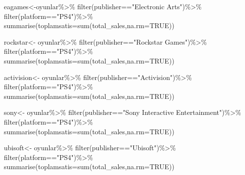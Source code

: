 \documentclass[
]{article}
\newenvironment{Shaded}{\begin{snugshade}}{\end{snugshade}}
\newcommand{\AttributeTok}[1]{\textcolor[rgb]{0.77,0.63,0.00}{#1}}
\newcommand{\ConstantTok}[1]{\textcolor[rgb]{0.00,0.00,0.00}{#1}}
\newcommand{\FunctionTok}[1]{\textcolor[rgb]{0.00,0.00,0.00}{#1}}
\newcommand{\NormalTok}[1]{#1}
\newcommand{\OtherTok}[1]{\textcolor[rgb]{0.56,0.35,0.01}{#1}}
\newcommand{\SpecialCharTok}[1]{\textcolor[rgb]{0.00,0.00,0.00}{#1}}
\newcommand{\StringTok}[1]{\textcolor[rgb]{0.31,0.60,0.02}{#1}}
\begin{document}
\begin{Shaded}
\begin{Highlighting}[]
\NormalTok{eagames}\OtherTok{\textless{}{-}}\NormalTok{oyunlar}\SpecialCharTok{\%\textgreater{}\%}
  \FunctionTok{filter}\NormalTok{(publisher}\SpecialCharTok{==}\StringTok{"Electronic Arts"}\NormalTok{)}\SpecialCharTok{\%\textgreater{}\%}
  \FunctionTok{filter}\NormalTok{(platform}\SpecialCharTok{==}\StringTok{"PS4"}\NormalTok{)}\SpecialCharTok{\%\textgreater{}\%}
  \FunctionTok{summarise}\NormalTok{(}\AttributeTok{toplamsatis=}\FunctionTok{sum}\NormalTok{(total\_sales,}\AttributeTok{na.rm=}\ConstantTok{TRUE}\NormalTok{))}

\NormalTok{rockstar}\OtherTok{\textless{}{-}}\NormalTok{ oyunlar}\SpecialCharTok{\%\textgreater{}\%}
  \FunctionTok{filter}\NormalTok{(publisher}\SpecialCharTok{==}\StringTok{"Rockstar Games"}\NormalTok{)}\SpecialCharTok{\%\textgreater{}\%}
  \FunctionTok{filter}\NormalTok{(platform}\SpecialCharTok{==}\StringTok{"PS4"}\NormalTok{)}\SpecialCharTok{\%\textgreater{}\%}
  \FunctionTok{summarise}\NormalTok{(}\AttributeTok{toplamsatis=}\FunctionTok{sum}\NormalTok{(total\_sales,}\AttributeTok{na.rm=}\ConstantTok{TRUE}\NormalTok{))}

\NormalTok{activision}\OtherTok{\textless{}{-}}\NormalTok{ oyunlar}\SpecialCharTok{\%\textgreater{}\%}
  \FunctionTok{filter}\NormalTok{(publisher}\SpecialCharTok{==}\StringTok{"Activision"}\NormalTok{)}\SpecialCharTok{\%\textgreater{}\%}
  \FunctionTok{filter}\NormalTok{(platform}\SpecialCharTok{==}\StringTok{"PS4"}\NormalTok{)}\SpecialCharTok{\%\textgreater{}\%}
  \FunctionTok{summarise}\NormalTok{(}\AttributeTok{toplamsatis=}\FunctionTok{sum}\NormalTok{(total\_sales,}\AttributeTok{na.rm=}\ConstantTok{TRUE}\NormalTok{))}

\NormalTok{sony}\OtherTok{\textless{}{-}}\NormalTok{ oyunlar}\SpecialCharTok{\%\textgreater{}\%}
  \FunctionTok{filter}\NormalTok{(publisher}\SpecialCharTok{==}\StringTok{"Sony Interactive Entertainment"}\NormalTok{)}\SpecialCharTok{\%\textgreater{}\%}
  \FunctionTok{filter}\NormalTok{(platform}\SpecialCharTok{==}\StringTok{"PS4"}\NormalTok{)}\SpecialCharTok{\%\textgreater{}\%}
  \FunctionTok{summarise}\NormalTok{(}\AttributeTok{toplamsatis=}\FunctionTok{sum}\NormalTok{(total\_sales,}\AttributeTok{na.rm=}\ConstantTok{TRUE}\NormalTok{))}

\NormalTok{ubisoft}\OtherTok{\textless{}{-}}\NormalTok{ oyunlar}\SpecialCharTok{\%\textgreater{}\%}
  \FunctionTok{filter}\NormalTok{(publisher}\SpecialCharTok{==}\StringTok{"Ubisoft"}\NormalTok{)}\SpecialCharTok{\%\textgreater{}\%}
  \FunctionTok{filter}\NormalTok{(platform}\SpecialCharTok{==}\StringTok{"PS4"}\NormalTok{)}\SpecialCharTok{\%\textgreater{}\%}
  \FunctionTok{summarise}\NormalTok{(}\AttributeTok{toplamsatis=}\FunctionTok{sum}\NormalTok{(total\_sales,}\AttributeTok{na.rm=}\ConstantTok{TRUE}\NormalTok{))}



\end{Highlighting}
\end{Shaded}
\end{document}
